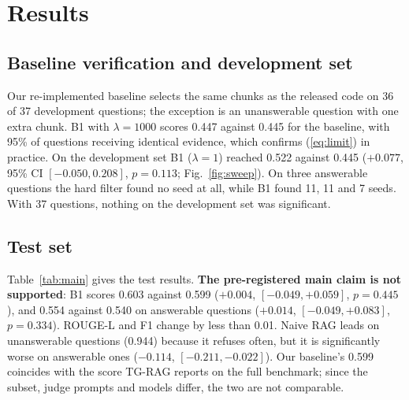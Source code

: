 \section{Results}
\subsection{Baseline verification and development set}
Our re-implemented baseline selects the same chunks as the released code on 36 of 37 development questions; the exception is an unanswerable question with one extra chunk. B1 with $\lambda = 1000$ scores 0.447 against 0.445 for the baseline, with 95\% of questions receiving identical evidence, which confirms (\ref{eq:limit}) in practice. On the development set B1 ($\lambda = 1$) reached 0.522 against 0.445 ($+0.077$, 95\% CI $[-0.050, 0.208]$, $p = 0.113$; Fig.~\ref{fig:sweep}). On three answerable questions the hard filter found no seed at all, while B1 found 11, 11 and 7 seeds. With 37 questions, nothing on the development set was significant.

\subsection{Test set}
Table~\ref{tab:main} gives the test results. \textbf{The pre-registered main claim is not supported}: B1 scores 0.603 against 0.599 ($+0.004$, $[-0.049, +0.059]$, $p = 0.445$), and 0.554 against 0.540 on answerable questions ($+0.014$, $[-0.049, +0.083]$, $p = 0.334$). ROUGE-L and F1 change by less than 0.01. Naive RAG leads on unanswerable questions (0.944) because it refuses often, but it is significantly worse on answerable ones ($-0.114$, $[-0.211, -0.022]$). Our baseline's 0.599 coincides with the score TG-RAG reports on the full benchmark; since the subset, judge prompts and models differ, the two are not comparable.

